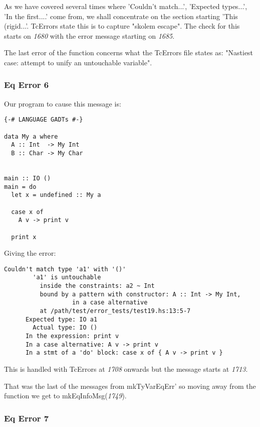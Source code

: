 \documentclass[a4paper]{article}
\begin{document}
As we have covered several times where 'Couldn't match...', 'Expected types...', 'In the first....' come from, we shall concentrate on the section starting 'This (rigid...'. TcErrors state this is to capture "skolem escape". The check for this starts on \textit{1680} with the error message starting on \textit{1685}. 

The last error of the function concerns what the TcErrors file states as: "Nastiest case: attempt to unify an untouchable variable". 

\pagebreak
\subsubsection{Eq Error 6}


Our program to cause this message is:

\begin{lstlisting}[label={lst: T12.0}, numbers=none, caption={Example Program \cite{ex12}}]
{-# LANGUAGE GADTs #-}

data My a where
  A :: Int  -> My Int
  B :: Char -> My Char


main :: IO ()
main = do
  let x = undefined :: My a

  case x of
    A v -> print v

  print x
\end{lstlisting}
Giving the error:

\begin{lstlisting}[label={lst: T12.0.2}, numbers=none, caption={Error}]
Couldn't match type 'a1' with '()'
        'a1' is untouchable
          inside the constraints: a2 ~ Int
          bound by a pattern with constructor: A :: Int -> My Int,
                   in a case alternative
          at /path/test/error_tests/test19.hs:13:5-7
      Expected type: IO a1
        Actual type: IO ()
      In the expression: print v
      In a case alternative: A v -> print v
      In a stmt of a 'do' block: case x of { A v -> print v }
\end{lstlisting}

This is handled with TcErrors at \textit{1708} onwards but the message starts at \textit{1713}. 


That was the last of the messages from mkTyVarEqErr' so moving away from the function we get to mkEqInfoMsg(\textit{1749}).

\subsubsection{Eq Error 7}
\end{document}
